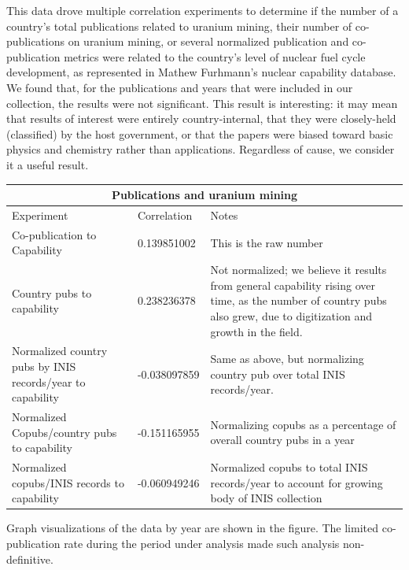 \documentclass{article} %
\begin{document}
This data drove multiple correlation experiments to determine if the number of a country's total publications related to uranium mining, their number of co-publications on uranium mining, or several normalized publication and co-publication metrics were related to the country's level of nuclear fuel cycle development, as represented in  Mathew Furhmann's nuclear capability database. We found that, for the publications and years that were included in our collection, the results were not significant. This result is interesting: it may mean that results of interest were entirely country-internal, that they were closely-held (classified) by the host government, or that the papers were biased toward basic physics and chemistry rather than applications. Regardless of cause, we consider it a useful result. 

\begin{tabular}{ |p{3.3cm}||p{2.5cm}|p{6cm}|  }
 \hline
 \multicolumn{3}{|c|}{\textbf{Publications and uranium mining}} \\
 \hline
 Experiment & Correlation & Notes\\
 \hline
 Co-publication to Capability   & 0.139851002    & This is the raw number\\
 \hline
 Country pubs to capability & 0.238236378  & Not normalized; we believe it results from general capability rising over time, as the number of country pubs also grew, due to digitization and growth in the field. \\
 \hline
 Normalized country pubs by INIS records/year to capability & -0.038097859 & Same as above, but normalizing country pub over total INIS records/year.\\
 \hline
 Normalized Copubs/country pubs to capability  & -0.151165955 & Normalizing copubs as a percentage of overall country pubs in a year\\
 \hline
 Normalized copubs/INIS records to capability &   -0.060949246 & Normalized copubs to total INIS records/year to account for growing body of INIS collection
\\
 \hline
\end{tabular}

Graph visualizations of the data by year are shown in the figure. The limited co-publication rate during the period under analysis made  such analysis non-definitive.
\end{document}
